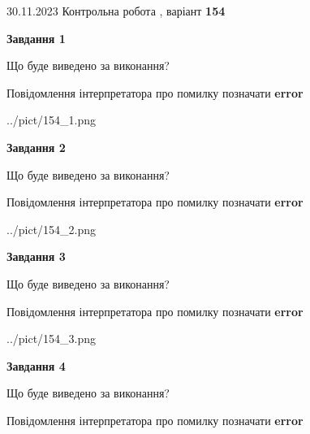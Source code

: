 \documentclass[12pt, ukrainian]{article}
\begin{document}
{{30.11.2023 Контрольна робота , варіант  \No \textbf { 154 }\par}}
{




{\begin {center}\textbf{Завдання 1}\end {center}}\par
Що буде виведено за виконання? \par
Повідомлення інтерпретатора про помилку позначати \textbf{error}

\begin{center}
	{../pict/154_1.png}
\end{center}
\newpage

{\begin {center}\textbf{Завдання 2}\end {center}}\par
Що буде виведено за виконання? \par
Повідомлення інтерпретатора про помилку позначати \textbf{error}

\begin{center}
	{../pict/154_2.png}
\end{center}
\newpage

{\begin {center}\textbf{Завдання 3}\end {center}}\par
Що буде виведено за виконання? \par
Повідомлення інтерпретатора про помилку позначати \textbf{error}

\begin{center}
	{../pict/154_3.png}
\end{center}
\newpage

{\begin {center}\textbf{Завдання 4}\end {center}}\par
Що буде виведено за виконання? \par
Повідомлення інтерпретатора про помилку позначати \textbf{error}

}
\end{document}
